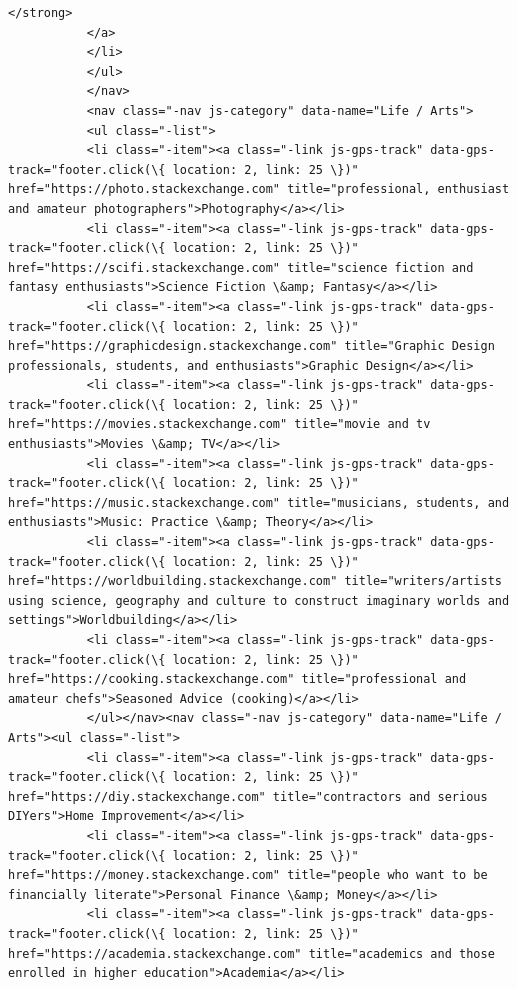 \documentclass[11pt]{article}
\begin{document}
\begin{Verbatim}[commandchars=\\\{\}]
                                   </strong>
           </a>
           </li>
           </ul>
           </nav>
           <nav class="-nav js-category" data-name="Life / Arts">
           <ul class="-list">
           <li class="-item"><a class="-link js-gps-track" data-gps-track="footer.click(\{ location: 2, link: 25 \})" href="https://photo.stackexchange.com" title="professional, enthusiast and amateur photographers">Photography</a></li>
           <li class="-item"><a class="-link js-gps-track" data-gps-track="footer.click(\{ location: 2, link: 25 \})" href="https://scifi.stackexchange.com" title="science fiction and fantasy enthusiasts">Science Fiction \&amp; Fantasy</a></li>
           <li class="-item"><a class="-link js-gps-track" data-gps-track="footer.click(\{ location: 2, link: 25 \})" href="https://graphicdesign.stackexchange.com" title="Graphic Design professionals, students, and enthusiasts">Graphic Design</a></li>
           <li class="-item"><a class="-link js-gps-track" data-gps-track="footer.click(\{ location: 2, link: 25 \})" href="https://movies.stackexchange.com" title="movie and tv enthusiasts">Movies \&amp; TV</a></li>
           <li class="-item"><a class="-link js-gps-track" data-gps-track="footer.click(\{ location: 2, link: 25 \})" href="https://music.stackexchange.com" title="musicians, students, and enthusiasts">Music: Practice \&amp; Theory</a></li>
           <li class="-item"><a class="-link js-gps-track" data-gps-track="footer.click(\{ location: 2, link: 25 \})" href="https://worldbuilding.stackexchange.com" title="writers/artists using science, geography and culture to construct imaginary worlds and settings">Worldbuilding</a></li>
           <li class="-item"><a class="-link js-gps-track" data-gps-track="footer.click(\{ location: 2, link: 25 \})" href="https://cooking.stackexchange.com" title="professional and amateur chefs">Seasoned Advice (cooking)</a></li>
           </ul></nav><nav class="-nav js-category" data-name="Life / Arts"><ul class="-list">
           <li class="-item"><a class="-link js-gps-track" data-gps-track="footer.click(\{ location: 2, link: 25 \})" href="https://diy.stackexchange.com" title="contractors and serious DIYers">Home Improvement</a></li>
           <li class="-item"><a class="-link js-gps-track" data-gps-track="footer.click(\{ location: 2, link: 25 \})" href="https://money.stackexchange.com" title="people who want to be financially literate">Personal Finance \&amp; Money</a></li>
           <li class="-item"><a class="-link js-gps-track" data-gps-track="footer.click(\{ location: 2, link: 25 \})" href="https://academia.stackexchange.com" title="academics and those enrolled in higher education">Academia</a></li>

\end{Verbatim}
\end{document}

